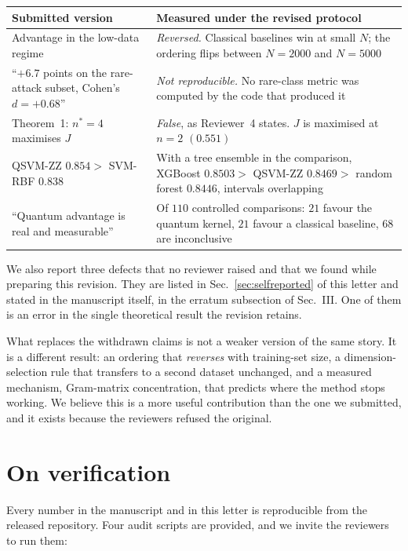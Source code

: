 \documentclass[11pt,a4paper]{article}
\begin{document}
\begin{center}
\small
\begin{tabular}{@{}p{7.3cm}p{8.3cm}@{}}
\toprule
\textbf{Submitted version} & \textbf{Measured under the revised protocol} \\
\midrule
Advantage in the low-data regime &
  \emph{Reversed.} Classical baselines win at small $N$; the ordering flips
  between $N=2000$ and $N=5000$ \\
``$+6.7$ points on the rare-attack subset, Cohen's $d=+0.68$'' &
  \emph{Not reproducible.} No rare-class metric was computed by the code that
  produced it \\
Theorem~1: $n^{\ast}=4$ maximises $J$ &
  \emph{False}, as Reviewer~4 states. $J$ is maximised at $n=2$ $(0.551)$ \\
QSVM-ZZ $0.854 >$ SVM-RBF $0.838$ &
  With a tree ensemble in the comparison, XGBoost $0.8503 >$ QSVM-ZZ $0.8469 >$
  random forest $0.8446$, intervals overlapping \\
``Quantum advantage is real and measurable'' &
  Of $110$ controlled comparisons: $21$ favour the quantum kernel, $21$ favour a
  classical baseline, $68$ are inconclusive \\
\bottomrule
\end{tabular}
\end{center}

\vspace{4pt}
We also report three defects that no reviewer raised and that we found while
preparing this revision. They are listed in Sec.~\ref{sec:selfreported} of this
letter and stated in the manuscript itself, in the erratum subsection of
Sec.~III. One of them is an error in the single theoretical result the revision
retains.

What replaces the withdrawn claims is not a weaker version of the same story. It
is a different result: an ordering that \emph{reverses} with training-set size,
a dimension-selection rule that transfers to a second dataset unchanged, and a
measured mechanism, Gram-matrix concentration, that predicts where the
method stops working. We believe this is a more useful contribution than the one
we submitted, and it exists because the reviewers refused the original.

\section*{On verification}

Every number in the manuscript and in this letter is reproducible from the
released repository. Four audit scripts are provided, and we invite the
reviewers to run them:
\end{document}
